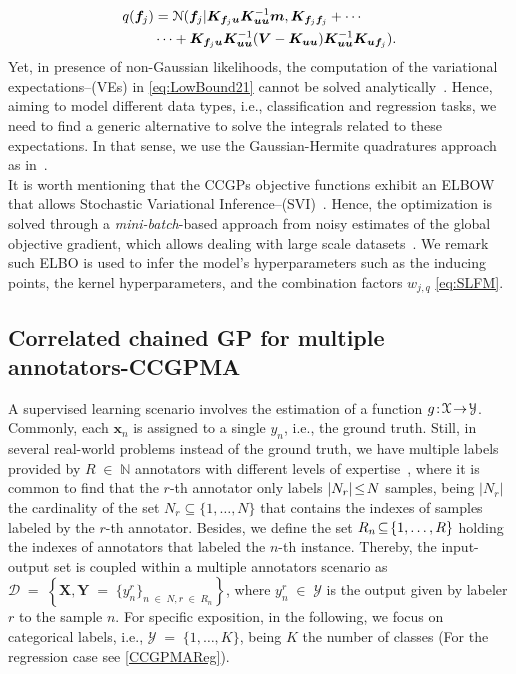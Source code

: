 \documentclass[journal]{IEEEtran}
\providecommand{\ve}[1]{{\bm{#1}}}%
\providecommand{\mat}[1]{{\bm{#1}}} %
\DeclareMathOperator{\en}{\!\,\in\!\,}
\DeclareMathOperator{\igual}{\!\,=\!\,}
\providecommand{\s}[1]{\negthinspace#1\negthinspace}%
\providecommand{\ve}[1]{{\mathbf{#1}}}
\providecommand{\mat}[1]{{\mathbf{#1}}}
\newcommand{\gauss}{\mathcal{N}} %
\begin{document}
\begin{align}
\notag q(\ve{f}_j) &=\gauss(\ve{f}_j|\mat{K}_{\ve{f}_j\ve{u}}\mat{K}_{\ve{u}\ve{u}}^{-1}\ve{m}, \mat{K}_{\ve{f}_j\ve{f}_j}+\cdots\\
& \cdots + \mat{K}_{\ve{f}_j\ve{u}}\mat{K}_{\ve{u}\ve{u}}^{-1}(\mat{V}-\mat{K}_{\ve{u}\ve{u}})\mat{K}_{\ve{u}\ve{u}}^{-1}\mat{K}_{\ve{u}\ve{f}_j}).
\end{align}
Yet, in presence of non-Gaussian likelihoods, the computation of the variational expectations--(VEs) in \cref{eq:LowBound21} cannot be solved analytically~\cite{saul2016chained,moreno2018heterogeneous}. Hence, aiming to model different data types, i.e., classification and regression tasks, we need to find a generic alternative to solve the integrals related to these expectations. In that sense, we use the Gaussian-Hermite quadratures approach as in~\cite{hensman2015scalable,saul2016chained}.\\
It is worth mentioning that the CCGPs objective functions exhibit an ELBOW that allows Stochastic Variational Inference--(SVI)~\cite{blei2017variational}. Hence, the optimization is solved through a \textit{mini-batch}-based approach from noisy estimates of the global objective gradient, which allows dealing with large scale datasets~\cite{hensman2015scalable,saul2016chained,moreno2018heterogeneous}. We remark such ELBO is used to infer the model's hyperparameters such as the inducing points, the kernel hyperparameters, and the combination factors $w_{j,q}$ \cref{eq:SLFM}.

\subsection{Correlated chained GP for multiple annotators-CCGPMA}

A supervised learning scenario involves the estimation of a function $g\s{:}\mathcal{X}\s{\to}\mathcal{Y}$. Commonly, each $\ve{x}_n$ is assigned to a single $y_n$, i.e., the ground truth. Still, in several real-world problems instead of the ground truth, we have multiple labels provided by $R \en\mathbb{N}$ annotators with different levels of expertise~\cite{raykar2010learning}, where it is common to find that the $r$-th annotator only labels $|N_r|\s{\le}N$ samples, being $|N_r|$ the cardinality of the set $N_r\subseteq\{1,\dots , N\}$ that contains the indexes of samples labeled by the $r$-th annotator. Besides, we define the set $R_n\s{\subseteq}\{1, \dots, R\}$ holding the indexes of annotators that labeled the $n$-th instance. Thereby, the input-output set is coupled within a multiple annotators scenario as $\mathcal{D} \igual \left\{\mat{X}, \mat{Y} \igual \{y_n^r\}_{n\en N,r\en R_n} \right\}$, where $y_n^r\en \mathcal{Y}$ is the output given by labeler $r$ to the sample $n$. For specific exposition, in the following, we focus on categorical labels, i.e., $\mathcal{Y}\igual\{1,\dots, K\}$, being $K$ the number of classes (For the regression case see \cref{CCGPMAReg}).
\end{document}
